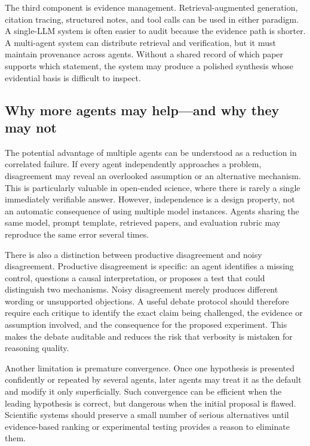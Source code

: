 \documentclass[11pt]{article}
\begin{document}
The third component is evidence management. Retrieval-augmented generation, citation tracing,
structured notes, and tool calls can be used in either paradigm. A single-LLM system is often easier
to audit because the evidence path is shorter. A multi-agent system can distribute retrieval and
verification, but it must maintain provenance across agents. Without a shared record of which paper
supports which statement, the system may produce a polished synthesis whose evidential basis is
difficult to inspect.

\subsection{Why more agents may help---and why they may not}
\label{subsec:more-agents}

The potential advantage of multiple agents can be understood as a reduction in correlated failure. If
every agent independently approaches a problem, disagreement may reveal an overlooked
assumption or an alternative mechanism. This is particularly valuable in open-ended science, where
there is rarely a single immediately verifiable answer. However, independence is a design property,
not an automatic consequence of using multiple model instances. Agents sharing the same model,
prompt template, retrieved papers, and evaluation rubric may reproduce the same error several
times.

There is also a distinction between productive disagreement and noisy disagreement. Productive
disagreement is specific: an agent identifies a missing control, questions a causal interpretation, or
proposes a test that could distinguish two mechanisms. Noisy disagreement merely produces
different wording or unsupported objections. A useful debate protocol should therefore require each
critique to identify the exact claim being challenged, the evidence or assumption involved, and the
consequence for the proposed experiment. This makes the debate auditable and reduces the risk that
verbosity is mistaken for reasoning quality.

Another limitation is premature convergence. Once one hypothesis is presented confidently or
repeated by several agents, later agents may treat it as the default and modify it only superficially.
Such convergence can be efficient when the leading hypothesis is correct, but dangerous when the
initial proposal is flawed. Scientific systems should preserve a small number of serious alternatives
until evidence-based ranking or experimental testing provides a reason to eliminate them.
\end{document}
